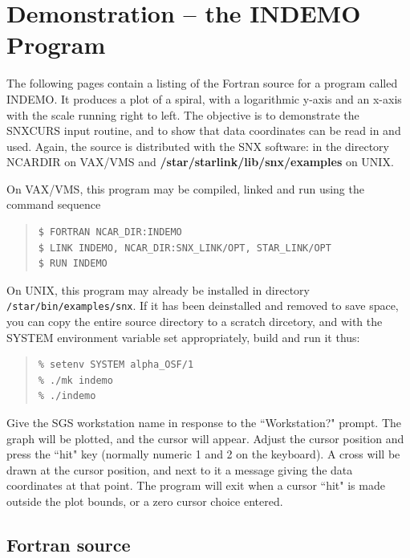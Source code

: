\documentclass[twoside,11pt]{article}
\renewcommand{\_}{\texttt{\symbol{95}}}
\begin{document}
\section {Demonstration -- the INDEMO Program} \label{demo3_sect}

The following pages contain a listing of the Fortran source for a program
called INDEMO.
It produces a plot of a spiral, with a logarithmic y-axis and an x-axis with
the scale running right to left.
The objective is to demonstrate the SNX\_CURS input routine, and to show that
data coordinates can be read in and used.
Again, the source is distributed with the SNX software: in the directory
NCAR\_DIR on VAX/VMS and {\bf /star/\-starlink/\-lib/\-snx/examples} on UNIX.

On VAX/VMS, this program may be compiled, linked and run using the command
sequence

\begin {quote}
\begin{verbatim}
$ FORTRAN NCAR_DIR:INDEMO
$ LINK INDEMO, NCAR_DIR:SNX_LINK/OPT, STAR_LINK/OPT
$ RUN INDEMO
\end{verbatim}
\end {quote}

On UNIX, this program may already be installed in directory 
{\tt /star/bin/examples/snx}.  If it has been deinstalled and removed to save
space, you can copy the entire source directory to a scratch dircetory, and
with the SYSTEM environment variable set appropriately, build and run it thus:

\begin {quote}
\begin{verbatim}
% setenv SYSTEM alpha_OSF/1
% ./mk indemo
% ./indemo
\end{verbatim}
\end {quote}

Give the SGS workstation name in response to the ``Workstation?" prompt.
The graph will be plotted, and the cursor will appear.
Adjust the cursor position and press the ``hit" key (normally numeric 1 and 2
on the keyboard).
A cross will be drawn at the cursor position, and next
to it a message giving the data coordinates at that point.
The program will exit when a cursor ``hit" is made outside the plot bounds,
or a zero cursor choice entered.


\subsection {Fortran source}
\end{document}
